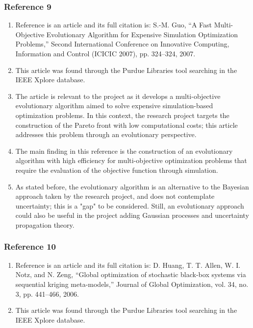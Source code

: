 \documentclass{journal}
\begin{document}
\subsubsection{Reference 9}
\begin{enumerate}
	\item Reference \cite{Guo2007} is an article and its full citation is: S.-M. Guo, “A Fast Multi-Objective Evolutionary Algorithm for Expensive Simulation Optimization Problems,” Second International Conference on Innovative Computing, Information and Control (ICICIC 2007), pp. 324–324, 2007.
	\item This article was found through the Purdue Libraries tool searching in the IEEE Xplore database.
	\item The article is relevant to the project as it develops a multi-objective evolutionary algorithm aimed to solve expensive simulation-based optimization problems. In this context, the research project targets the construction of the Pareto front with low computational costs; this article addresses this problem through an evolutionary perspective.
	\item The main finding in this reference is the construction of an evolutionary algorithm with high efficiency for multi-objective optimization problems that require the evaluation of the objective function through simulation.
	\item As stated before, the evolutionary algorithm is an alternative to the Bayesian approach taken by the research project, and does not contemplate uncertainty; this is a "gap" to be considered. Still, an evolutionary approach could also be useful in the project adding Gaussian processes and uncertainty propagation theory.
\end{enumerate}

\subsubsection{Reference 10}
\begin{enumerate}
	\item Reference \cite{Huang2006} is an article and its full citation is:  D. Huang, T. T. Allen, W. I. Notz, and N. Zeng, “Global optimization of stochastic black-box systems via sequential kriging meta-models,” Journal of Global Optimization, vol. 34, no. 3, pp. 441–466, 2006.
	\item This article was found through the Purdue Libraries tool searching in the IEEE Xplore database.
\end{enumerate}
\end{document}
